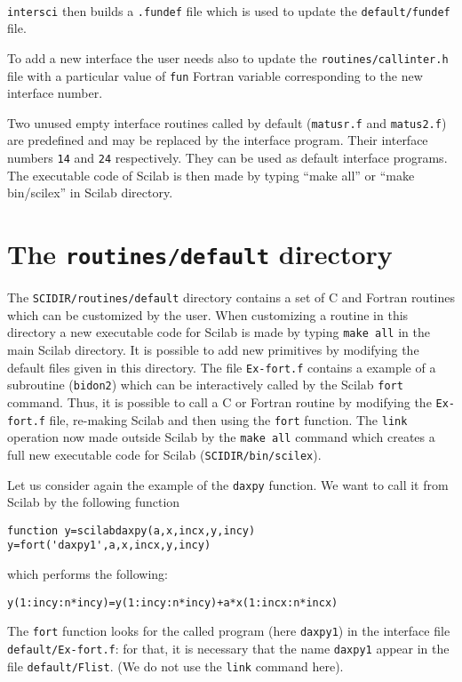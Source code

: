 \T{\ }\\

{\tt intersci} then builds a {\tt .fundef} file which is used to
update the {\tt default/fundef} file.

To add a new interface the user needs also
to update the {\tt   routines/callinter.h} file with a particular 
value of {\tt fun} Fortran variable corresponding to the new interface
number.

Two unused empty interface routines called by default ({\tt matusr.f} 
and {\tt matus2.f}) are predefined and may be replaced by 
the interface program. Their interface numbers {\tt 14} and {\tt 24}
respectively. They can be used as default interface programs.
The executable code of Scilab is then made by typing ``make all''
or ``make bin/scilex'' in Scilab directory.

\section{The {\tt routines/default} directory}

The {\tt SCIDIR/routines/default} directory contains a set of C and Fortran
routines which can be customized by the user. When customizing a
routine in this directory a new executable code for Scilab is made
by typing {\tt make all} in the main Scilab directory. 
It is possible to add new primitives by modifying the default files
given in this directory. The file {\tt Ex-fort.f} contains a example
of a subroutine ({\tt bidon2}) which can be interactively called
by the Scilab {\tt fort} command. Thus, it is possible 
to call a C or Fortran routine by modifying the {\tt Ex-fort.f}
file, re-making Scilab and then using the {\tt fort} function.
The {\tt link} operation now made outside Scilab by the {\tt make all}
command which creates a full new executable code for Scilab 
({\tt SCIDIR/bin/scilex}).

Let us consider again the example of the {\tt daxpy} function.
We want to call it from Scilab by the following function 
\begin{verbatim}
function y=scilabdaxpy(a,x,incx,y,incy)
y=fort('daxpy1',a,x,incx,y,incy)
\end{verbatim}
which performs the following: 

\verb!y(1:incy:n*incy)=y(1:incy:n*incy)+a*x(1:incx:n*incx)!

\noindent
The {\tt fort} 
function looks for the called program (here {\tt daxpy1}) in the
interface file {\tt default/Ex-fort.f}: for that, it is necessary
that the name {\tt daxpy1} appear
in the file {\tt default/Flist}. (We do not use the {\tt link} command
here).

